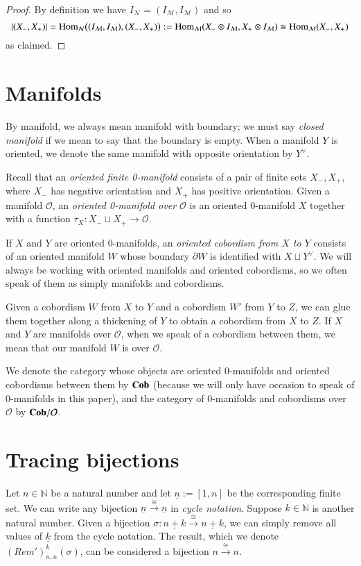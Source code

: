 \documentclass{amsart}
\def\tn{\textnormal}
\def\mc{\mathcal}
\def\NN{{\mathbb N}}
\def\Hom{\tn{Hom}}
\def\to{\rightarrow}
\def\taking{\colon}
\def\iso{\cong}
\def\ul{\underline}
\newcommand{\To}[1]{\xrightarrow{#1}}
\def\Cob{{\bf Cob}}
\def\mcM{\mc{M}}
\def\mcN{\mc{N}}
\def\mcO{\mc{O}}
\newcommand{\inp}[1]{{#1_-}}
\newcommand{\outp}[1]{{#1_+}}
\theoremstyle{remark}
\theoremstyle{definition}
\begin{document}
\begin{proof}
By definition we have $I_\mcN=(I_\mcM,I_\mcM)$ and so
$$|(X_-,X_+)|=\Hom_\mcN\big((I_\mcM,I_\mcM),(X_-,X_+)\big):=\Hom_\mcM(X_-\otimes I_\mcM,X_+\otimes I_\mcM)\iso\Hom_\mcM(X_-,X_+)$$
as claimed.
\end{proof}

\section{Manifolds}

By manifold, we always mean manifold with boundary; we must say {\em closed manifold} if we mean to say that the boundary is empty. When a manifold $Y$ is oriented, we denote the same manifold with opposite orientation by $Y^\vee$.

Recall that an {\em oriented finite 0-manifold} consists of a pair of finite sets $\inp{X},\outp{X}$, where $\inp{X}$ has negative orientation and $\outp{X}$ has positive orientation. Given a manifold $\mcO$, an {\em oriented 0-manifold over $\mcO$} is an oriented $0$-manifold $X$ together with a function $\tau_X\taking\inp{X}\sqcup \outp{X}\to\mcO$. 

If $X$ and $Y$ are oriented $0$-manifolds, an {\em oriented cobordism from $X$ to $Y$} consists of an oriented manifold $W$ whose boundary $\partial W$ is identified with $X\sqcup Y^\vee$. We will always be working with oriented manifolds and oriented cobordisms, so we often speak of them as simply manifolds and cobordisms. 

Given a cobordism $W$ from $X$ to $Y$ and a cobordism $W'$ from $Y$ to $Z$, we can glue them together along a thickening of $Y$ to obtain a cobordism from $X$ to $Z$. If $X$ and $Y$ are manifolds over $\mcO$, when we speak of a cobordism between them, we mean that our manifold $W$ is over $\mcO$.

We denote the category whose objects are oriented $0$-manifolds and oriented cobordisms between them by $\Cob$ (because we will only have occasion to speak of $0$-manifolds in this paper), and the category of 0-manifolds and cobordisms over $\mcO$ by $\Cob/\mcO$.

\section{Tracing bijections}

Let $n\in\NN$ be a natural number and let $\ul{n}:=[1,n]$ be the corresponding finite set. We can write any bijection $\ul{n}\To{\iso}\ul{n}$ in {\em cycle notation}. Suppose $k\in\NN$ is another natural number. Given a bijection $\sigma\taking\ul{n+k}\To{\iso}\ul{n+k}$, we can simply remove all values of $\ul{k}$ from the cycle notation. The result, which we denote $(Rem')^k_{n,n}(\sigma)$, can be considered a bijection $n\To{\iso}n$.
\end{document}
